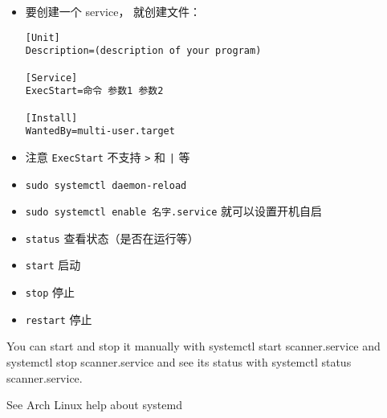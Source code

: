 
\begin{itemize}
\item 要创建一个 service， 就创建文件：
\begin{lstlisting}[language=none,caption=/etc/systemd/system/名字.service]
[Unit]
Description=(description of your program)

[Service]
ExecStart=命令 参数1 参数2

[Install]
WantedBy=multi-user.target
\end{lstlisting}
\item 注意 \verb|ExecStart| 不支持 \verb|>| 和 \verb`|` 等
\item \verb|sudo systemctl daemon-reload|
\item \verb|sudo systemctl enable 名字.service| 就可以设置开机自启
\item \verb|status| 查看状态（是否在运行等）
\item \verb|start| 启动
\item \verb|stop| 停止
\item \verb|restart| 停止
\end{itemize}

You can start and stop it manually with systemctl start scanner.service and systemctl stop scanner.service and see its status with systemctl status scanner.service.

See Arch Linux help about systemd